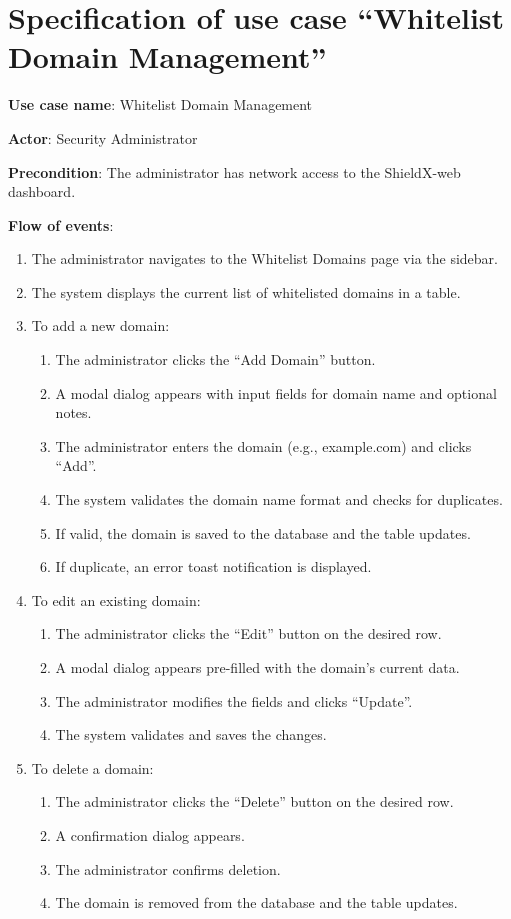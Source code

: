 \documentclass[../Main.tex]{subfiles}
\begin{document}
\section{Specification of use case ``Whitelist Domain Management''}

\textbf{Use case name}: Whitelist Domain Management

\textbf{Actor}: Security Administrator

\textbf{Precondition}: The administrator has network access to the ShieldX-web dashboard.

\textbf{Flow of events}:
\begin{enumerate}
    \item The administrator navigates to the Whitelist Domains page via the sidebar.
    \item The system displays the current list of whitelisted domains in a table.
    \item To add a new domain:
    \begin{enumerate}
        \item The administrator clicks the ``Add Domain'' button.
        \item A modal dialog appears with input fields for domain name and optional notes.
        \item The administrator enters the domain (e.g., example.com) and clicks ``Add''.
        \item The system validates the domain name format and checks for duplicates.
        \item If valid, the domain is saved to the database and the table updates.
        \item If duplicate, an error toast notification is displayed.
    \end{enumerate}
    \item To edit an existing domain:
    \begin{enumerate}
        \item The administrator clicks the ``Edit'' button on the desired row.
        \item A modal dialog appears pre-filled with the domain's current data.
        \item The administrator modifies the fields and clicks ``Update''.
        \item The system validates and saves the changes.
    \end{enumerate}
    \item To delete a domain:
    \begin{enumerate}
        \item The administrator clicks the ``Delete'' button on the desired row.
        \item A confirmation dialog appears.
        \item The administrator confirms deletion.
        \item The domain is removed from the database and the table updates.
    \end{enumerate}
\end{enumerate}
\end{document}
